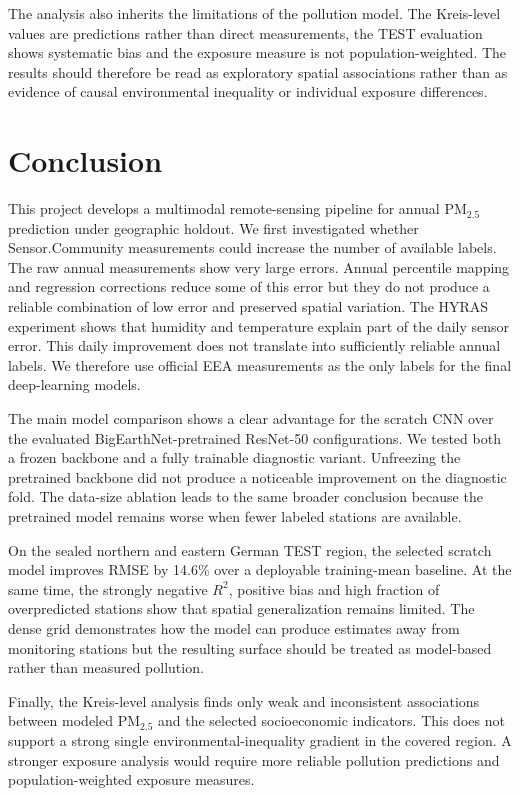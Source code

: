 \documentclass[english, a4paper]{article}
\begin{document}
The analysis also inherits the limitations of the pollution model. The Kreis-level values are predictions rather than direct measurements, the TEST evaluation shows systematic bias and the exposure measure is not population-weighted. The results should therefore be read as exploratory spatial associations rather than as evidence of causal environmental inequality or individual exposure differences.


\section{Conclusion}
\label{sec:conclusion}

This project develops a multimodal remote-sensing pipeline for annual PM$_{2.5}$ prediction under geographic holdout. We first investigated whether Sensor.Community measurements could increase the number of available labels. The raw annual measurements show very large errors. Annual percentile mapping and regression corrections reduce some of this error but they do not produce a reliable combination of low error and preserved spatial variation. The HYRAS experiment shows that humidity and temperature explain part of the daily sensor error. This daily improvement does not translate into sufficiently reliable annual labels. We therefore use official EEA measurements as the only labels for the final deep-learning models.

The main model comparison shows a clear advantage for the scratch CNN over the evaluated BigEarthNet-pretrained ResNet-50 configurations. We tested both a frozen backbone and a fully trainable diagnostic variant. Unfreezing the pretrained backbone did not produce a noticeable improvement on the diagnostic fold. The data-size ablation leads to the same broader conclusion because the pretrained model remains worse when fewer labeled stations are available.

On the sealed northern and eastern German TEST region, the selected scratch model improves RMSE by 14.6\% over a deployable training-mean baseline. At the same time, the strongly negative $R^2$, positive bias and high fraction of overpredicted stations show that spatial generalization remains limited. The dense grid demonstrates how the model can produce estimates away from monitoring stations but the resulting surface should be treated as model-based rather than measured pollution.

Finally, the Kreis-level analysis finds only weak and inconsistent associations between modeled PM$_{2.5}$ and the selected socioeconomic indicators. This does not support a strong single environmental-inequality gradient in the covered region. A stronger exposure analysis would require more reliable pollution predictions and population-weighted exposure measures.
\end{document}
